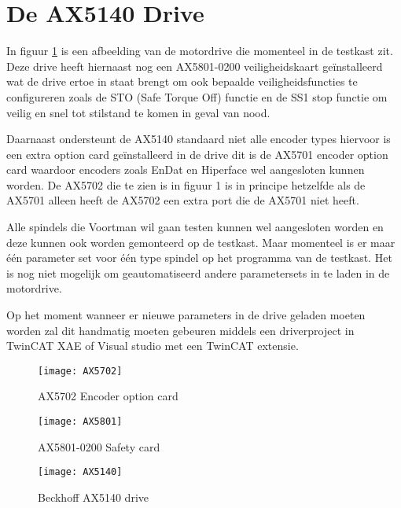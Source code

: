 \section{De AX5140 Drive}

In figuur \ref{fig:AX5140} is een afbeelding van de motordrive die momenteel in de testkast zit. Deze drive heeft hiernaast nog een \gls{AX5801}-0200 veiligheidskaart geïnstalleerd wat de drive ertoe in staat brengt om ook bepaalde veiligheidsfuncties te configureren zoals de \gls{STO} (Safe Torque Off) functie en de \gls{SS1} stop functie om veilig en snel tot stilstand te komen in geval van nood. \cite{web:AX5801}

\vspace{0.5cm}

Daarnaast ondersteunt de \gls{AX5140} standaard niet alle encoder types hiervoor is een extra option card geïnstalleerd in de drive dit is de \gls{AX5701} encoder option card waardoor encoders zoals EnDat en Hiperface wel aangesloten kunnen worden. De \gls{AX5702} die te zien is in figuur 1 is in principe hetzelfde als de \gls{AX5701} alleen heeft de \gls{AX5702} een extra port die de \gls{AX5701} niet heeft. 

\vspace{0.5cm}

Alle spindels die Voortman wil gaan testen kunnen wel aangesloten worden en deze kunnen ook worden gemonteerd op de testkast. Maar momenteel is er maar één parameter set voor één type spindel op het programma van de testkast. Het is nog niet mogelijk om geautomatiseerd andere parametersets in te laden in de motordrive.

\vspace{0.5cm}

Op het moment wanneer er nieuwe parameters in de drive geladen moeten worden zal dit handmatig moeten gebeuren middels een driverproject in TwinCAT XAE of Visual studio met een TwinCAT extensie.


\begin{figure}[h]
	\centering
	\begin{minipage}{0.32\textwidth}
		\texttt{[image: AX5702]}
		\vspace{0pt}
		\caption{\gls{AX5702} Encoder option card \cite{web:AX5701}}
		\label{fig:AX5702}
	\end{minipage}
	\hfill
	\begin{minipage}{0.32\textwidth}
		\texttt{[image: AX5801]}
		\vspace{0pt}
		\caption{\gls{AX5801}-0200 Safety card \cite{web:AX5801}}
		\label{fig:AX5801}
	\end{minipage}
	\hfill
	\begin{minipage}{0.32\textwidth}
		\texttt{[image: AX5140]}
		\vspace{0pt}
		\caption{Beckhoff \gls{AX5140} drive \cite{web:AX5140Drive}}
		\label{fig:AX5140}
	\end{minipage}
\end{figure}

